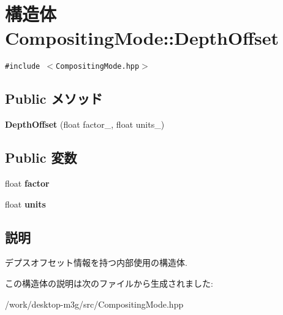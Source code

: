 \hypertarget{structm3g_1_1CompositingMode_1_1DepthOffset}{
\section{構造体 CompositingMode::DepthOffset}
\label{structm3g_1_1CompositingMode_1_1DepthOffset}
}
{\tt \#include $<$CompositingMode.hpp$>$}

\subsection*{Public メソッド}
\begin{CompactItemize}
\item 
\hypertarget{structm3g_1_1CompositingMode_1_1DepthOffset_5bca742cc2bf312b60933a538d3d4107}{
\textbf{DepthOffset} (float factor\_\-, float units\_\-)}
\label{structm3g_1_1CompositingMode_1_1DepthOffset_5bca742cc2bf312b60933a538d3d4107}

\end{CompactItemize}
\subsection*{Public 変数}
\begin{CompactItemize}
\item 
\hypertarget{structm3g_1_1CompositingMode_1_1DepthOffset_323c112c11500270be91b7cb353826bd}{
float \textbf{factor}}
\label{structm3g_1_1CompositingMode_1_1DepthOffset_323c112c11500270be91b7cb353826bd}

\item 
\hypertarget{structm3g_1_1CompositingMode_1_1DepthOffset_1c0298a96a707800b8223cbf532ab42c}{
float \textbf{units}}
\label{structm3g_1_1CompositingMode_1_1DepthOffset_1c0298a96a707800b8223cbf532ab42c}

\end{CompactItemize}


\subsection{説明}
デプスオフセット情報を持つ内部使用の構造体. 

この構造体の説明は次のファイルから生成されました:\begin{CompactItemize}
\item 
/work/desktop-m3g/src/CompositingMode.hpp\end{CompactItemize}
